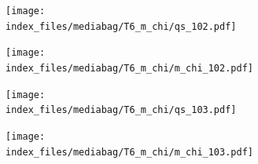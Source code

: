 \documentclass[
  11pt,
  letterpaper,
]{scrreprt}
\begin{document}
\begin{figure}

\begin{minipage}{0.50\linewidth}

\begin{figure}[H]

{\centering \texttt{[image: index\_files/mediabag/T6\_m\_chi/qs\_102.pdf]}

}


\end{figure}%

\end{minipage}%
%
\begin{minipage}{0.50\linewidth}

\begin{figure}[H]

{\centering \texttt{[image: index\_files/mediabag/T6\_m\_chi/m\_chi\_102.pdf]}

}


\end{figure}%

\end{minipage}%

\end{figure}%

\begin{figure}

\begin{minipage}{0.50\linewidth}

\begin{figure}[H]

{\centering \texttt{[image: index\_files/mediabag/T6\_m\_chi/qs\_103.pdf]}

}


\end{figure}%

\end{minipage}%
%
\begin{minipage}{0.50\linewidth}

\begin{figure}[H]

{\centering \texttt{[image: index\_files/mediabag/T6\_m\_chi/m\_chi\_103.pdf]}

}


\end{figure}%

\end{minipage}%

\end{figure}%
\end{document}
